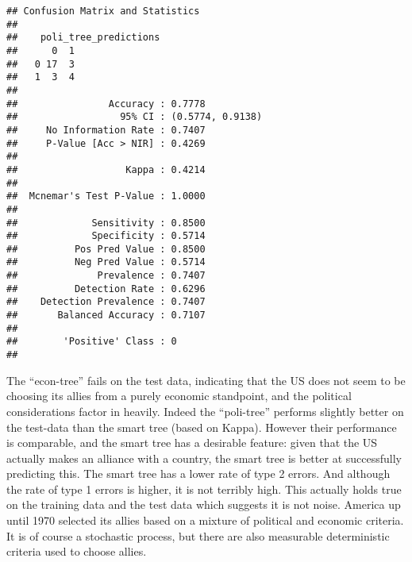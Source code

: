 \documentclass[
]{article}
\newenvironment{Shaded}{\begin{snugshade}}{\end{snugshade}}
\newcommand{\AttributeTok}[1]{\textcolor[rgb]{0.77,0.63,0.00}{#1}}
\newcommand{\FunctionTok}[1]{\textcolor[rgb]{0.00,0.00,0.00}{#1}}
\newcommand{\NormalTok}[1]{#1}
\newcommand{\OtherTok}[1]{\textcolor[rgb]{0.56,0.35,0.01}{#1}}
\newcommand{\SpecialCharTok}[1]{\textcolor[rgb]{0.00,0.00,0.00}{#1}}
\newcommand{\StringTok}[1]{\textcolor[rgb]{0.31,0.60,0.02}{#1}}
\begin{document}
\begin{Shaded}
\end{Shaded}

\begin{verbatim}
## Confusion Matrix and Statistics
## 
##    poli_tree_predictions
##      0  1
##   0 17  3
##   1  3  4
##                                           
##                Accuracy : 0.7778          
##                  95% CI : (0.5774, 0.9138)
##     No Information Rate : 0.7407          
##     P-Value [Acc > NIR] : 0.4269          
##                                           
##                   Kappa : 0.4214          
##                                           
##  Mcnemar's Test P-Value : 1.0000          
##                                           
##             Sensitivity : 0.8500          
##             Specificity : 0.5714          
##          Pos Pred Value : 0.8500          
##          Neg Pred Value : 0.5714          
##              Prevalence : 0.7407          
##          Detection Rate : 0.6296          
##    Detection Prevalence : 0.7407          
##       Balanced Accuracy : 0.7107          
##                                           
##        'Positive' Class : 0               
## 
\end{verbatim}

The ``econ-tree'' fails on the test data, indicating that the US does
not seem to be choosing its allies from a purely economic standpoint,
and the political considerations factor in heavily. Indeed the
``poli-tree'' performs slightly better on the test-data than the smart
tree (based on Kappa). However their performance is comparable, and the
smart tree has a desirable feature: given that the US actually makes an
alliance with a country, the smart tree is better at successfully
predicting this. The smart tree has a lower rate of type 2 errors. And
although the rate of type 1 errors is higher, it is not terribly high.
This actually holds true on the training data and the test data which
suggests it is not noise. America up until 1970 selected its allies
based on a mixture of political and economic criteria. It is of course a
stochastic process, but there are also measurable deterministic criteria
used to choose allies.
\end{document}
